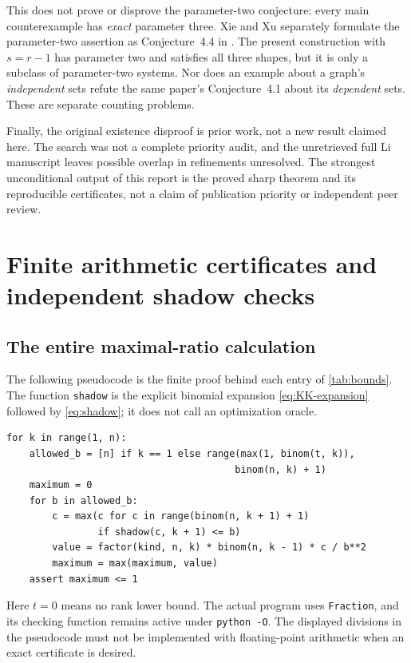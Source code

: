 \documentclass[11pt,letterpaper]{article}
\numberwithin{equation}{section}
\theoremstyle{definition}
\theoremstyle{remark}
\begin{document}
This does not prove or disprove the parameter-two conjecture: every main
counterexample has \emph{exact} parameter three. Xie and Xu separately
formulate the parameter-two assertion as Conjecture~4.4 in \cite{XieXu}.
The present construction with $s=r-1$ has parameter two and satisfies all
three shapes, but it is only a subclass of parameter-two systems.
Nor does an example about a graph's \emph{independent} sets refute the
same paper's Conjecture~4.1 about its \emph{dependent} sets. These are
separate counting problems.

Finally, the original existence disproof is prior work, not a new result
claimed here. The search was not a complete priority audit, and the
unretrieved full Li manuscript leaves possible overlap in refinements
unresolved. The strongest unconditional output of this report is the
proved sharp theorem and its reproducible certificates, not a claim of
publication priority or independent peer review.

\appendix
\section{Finite arithmetic certificates and independent shadow checks}
\label{app:certificates}

\subsection{The entire maximal-ratio calculation}
The following pseudocode is the finite proof behind each entry of
\cref{tab:bounds}. The function \texttt{shadow} is the explicit
binomial expansion \eqref{eq:KK-expansion} followed by
\eqref{eq:shadow}; it does not call an optimization oracle.
\begin{lstlisting}
for k in range(1, n):
    allowed_b = [n] if k == 1 else range(max(1, binom(t, k)),
                                        binom(n, k) + 1)
    maximum = 0
    for b in allowed_b:
        c = max(c for c in range(binom(n, k + 1) + 1)
                if shadow(c, k + 1) <= b)
        value = factor(kind, n, k) * binom(n, k - 1) * c / b**2
        maximum = max(maximum, value)
    assert maximum <= 1
\end{lstlisting}
Here $t=0$ means no rank lower bound. The actual program uses
\texttt{Fraction}, and its checking function remains active under
\texttt{python -O}. The displayed divisions in the pseudocode must not
be implemented with floating-point arithmetic when an exact certificate
is desired.
\end{document}
